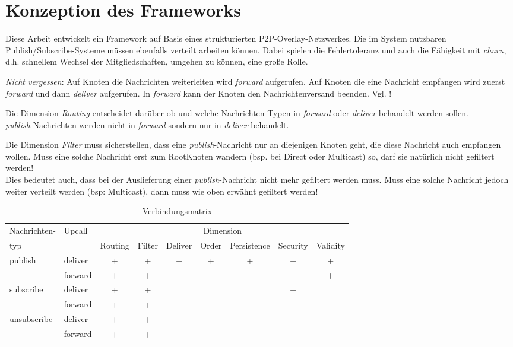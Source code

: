 \chapter{Konzeption des Frameworks}
\label{chap:konzeption_pubsub}
Diese Arbeit entwickelt ein Framework auf Basis eines strukturierten P2P-Overlay-Netzwerkes. Die im System nutzbaren Publish/Subscribe-Systeme müssen ebenfalls verteilt arbeiten können. Dabei spielen die Fehlertoleranz und auch die Fähigkeit mit \emph{churn}, d.h. schnellem Wechsel der Mitgliedschaften, umgehen zu können, eine große Rolle.

\emph{Nicht vergessen}: Auf Knoten die Nachrichten weiterleiten wird \emph{forward} aufgerufen. Auf Knoten die eine Nachricht empfangen wird zuerst \emph{forward} und dann \emph{deliver} aufgerufen. In \emph{forward} kann der Knoten den Nachrichtenversand beenden. Vgl. !

Die Dimension \emph{Routing} entscheidet darüber ob und welche Nachrichten Typen in \emph{forward} oder \emph{deliver} behandelt werden sollen.\\
\emph{publish}-Nachrichten werden nicht in \emph{forward} sondern nur in \emph{deliver} behandelt.

Die Dimension \emph{Filter} muss sicherstellen, dass eine \emph{publish}-Nachricht nur an diejenigen Knoten geht, die diese Nachricht auch empfangen wollen. Muss eine solche Nachricht erst zum RootKnoten wandern (bsp. bei Direct oder Multicast) so, darf sie natürlich nicht gefiltert werden!\\
Dies bedeutet auch, dass bei der Auslieferung einer \emph{publish}-Nachricht nicht mehr gefiltert werden muss. Muss eine solche Nachricht jedoch weiter verteilt werden (bsp: Multicast), dann muss wie oben erwähnt gefiltert werden!

\begin{table}[!h]
\label{tab:konzeption_pubsub:verbindungsmatrix}
\begin{tabular}{llccccccc}
\toprule
Nachrichten- & Upcall	& \multicolumn{7}{c}{Dimension} \\
\cmidrule{3-9}
typ				&		& Routing & Filter & Deliver & Order & Persistence & Security & Validity \\
\midrule
publish	    & deliver & + & + & + & + & + & + & + \\
\cmidrule{2-9}
					  & forward & + & + & + &   &   & + & + \\
\midrule
subscribe	  & deliver & + & + &   &   &   & + & \\
\cmidrule{2-9}
			      & forward & + & + &   &   &   & + & \\
\midrule
unsubscribe & deliver & + & + &   &   &   & + & \\
\cmidrule{2-9}
      & forward & + & + &   &   &   & + & \\
\bottomrule
\end{tabular}
\caption{Verbindungsmatrix}
\end{table}






\cite{BeFiMu2006PubSubQoS}


\cite{KostasKatrinis2005}
